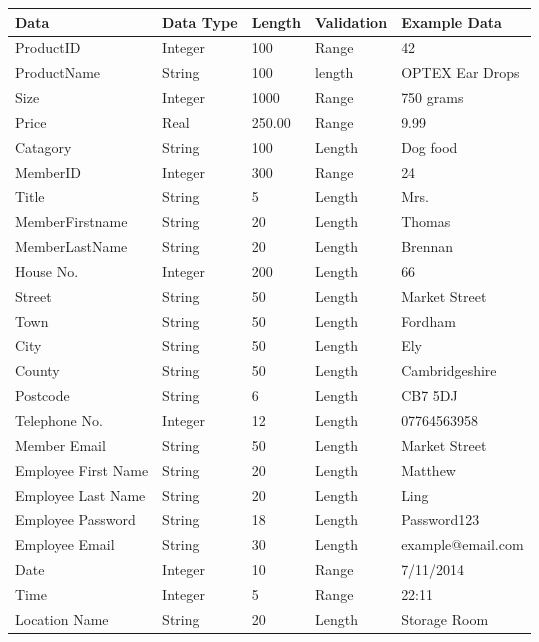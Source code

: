    \begin{tabular}{|p{3cm}|p{2cm}|p{1.2cm}|p{2cm}|p{3cm}|}
        \hline
        \textbf{Data} & \textbf{Data Type} & \textbf{Length} & \textbf{Validation} & \textbf{Example Data}\\ \hline
	ProductID & Integer & 100 & Range & 42 \\ \hline
	ProductName & String & 100 & length & OPTEX Ear Drops \\ \hline
	Size & Integer & 1000 & Range & 750 grams \\ \hline
          Price & Real & 250.00 & Range & 9.99 \\ \hline
          Catagory & String & 100 & Length & Dog food \\ \hline
          MemberID & Integer & 300 & Range & 24 \\ \hline
	Title & String & 5 & Length & Mrs. \\ \hline
          MemberFirstname & String & 20 & Length & Thomas \\ \hline
          MemberLastName & String & 20 & Length & Brennan \\ \hline
          House No. & Integer & 200 & Length & 66 \\ \hline
	Street & String & 50 & Length & Market Street \\ \hline
	Town & String & 50 & Length & Fordham \\ \hline
         City & String & 50 & Length & Ely \\ \hline
         County & String & 50 & Length & Cambridgeshire \\ \hline
         Postcode & String & 6 & Length & CB7 5DJ \\ \hline
         Telephone No. & Integer & 12 & Length & 07764563958 \\ \hline
	Member Email & String & 50 & Length & Market Street \\ \hline
	Employee First Name & String & 20 & Length & Matthew \\ \hline
	Employee Last Name & String & 20 & Length & Ling \\ \hline
	Employee Password & String & 18 & Length & Password123 \\ \hline
	Employee Email & String & 30 & Length & example@email.com \\ \hline
	Date & Integer & 10 & Range & 7/11/2014 \\ \hline
	Time & Integer & 5 & Range & 22:11 \\ \hline
	Location Name & String & 20 & Length & Storage Room \\ \hline
  \end{tabular}

